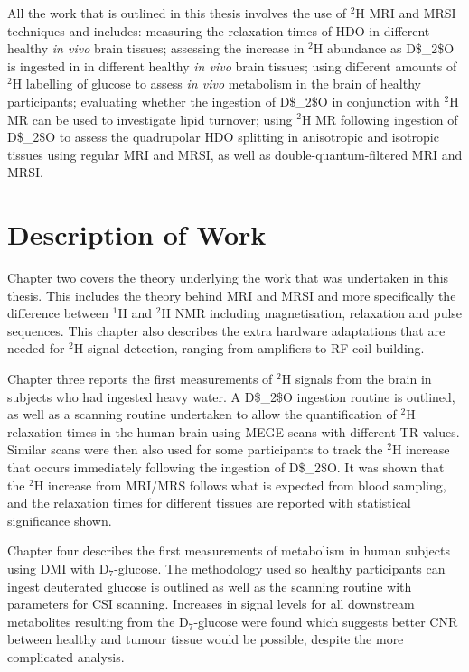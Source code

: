 All the work that is outlined in this thesis involves the use of 
 $^2$H \ac{MRI} and \ac{MRSI} techniques and includes: measuring the relaxation times of \ac{HDO} in different healthy \textit{in vivo} brain tissues; assessing the increase in $^2$H abundance as \Ac{D$_2$O} is ingested in in different healthy \textit{in vivo} brain tissues; using different amounts of $^2$H labelling of glucose to assess \textit{in vivo} metabolism in the brain of healthy participants; evaluating whether the ingestion of \Ac{D$_2$O} in conjunction with $^2$H MR can be used to investigate lipid turnover; using $^2$H MR following ingestion of \Ac{D$_2$O} to assess the quadrupolar \ac{HDO} splitting in anisotropic and isotropic tissues using regular \ac{MRI} and \ac{MRSI}, as well as double-quantum-filtered \ac{MRI} and MRSI.

\section{Description of Work}

Chapter two covers the theory underlying the work that was undertaken in this thesis. This includes the theory behind \ac{MRI} and \ac{MRSI} and more specifically the difference between $^1$H and $^2$H \ac{NMR} including magnetisation, relaxation and pulse sequences. This chapter also describes the extra hardware adaptations that are needed for $^2$H signal detection, ranging from amplifiers to \ac{RF} coil building.

Chapter three reports the first measurements of $^2$H signals from the brain in subjects who had ingested heavy water. A \ac{D$_2$O} ingestion routine is outlined, as well as a scanning routine undertaken to allow the quantification of $^2$H relaxation times in the human brain using \ac{MEGE} scans with different \ac{TR}-values. Similar scans were then also used for some participants to track the $^2$H increase that occurs immediately following the ingestion of \ac{D$_2$O}. It was shown that the $^2$H increase from \ac{MRI}/\ac{MRS} follows what is expected from blood sampling, and the relaxation times for different tissues are reported with statistical significance shown.


Chapter four describes the first measurements of metabolism in human subjects using \ac{DMI} with D$_7$-glucose. The methodology used so healthy participants can ingest deuterated glucose is outlined as well as the scanning routine with parameters for CSI scanning. Increases in signal levels for all downstream metabolites resulting from the D$_7$-glucose were found which suggests better \ac{CNR} between healthy and tumour tissue would be possible, despite the more complicated analysis.

